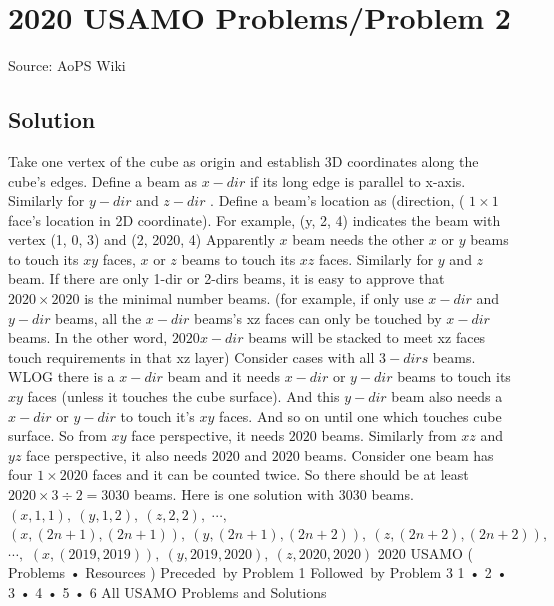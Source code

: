 \documentclass[12pt]{article}
\begin{document}
\section*{{2020 USAMO Problems/Problem 2}}
Source: AoPS Wiki

\subsection*{Solution}
Take one vertex of the cube as origin and establish 3D coordinates along the cube's edges. Define a beam as $x-dir$ if its long edge is parallel to x-axis. Similarly for $y-dir$ and $z-dir$ . Define a beam's location as (direction, ( $1 \times 1$ face's location in 2D coordinate). For example, (y, 2, 4) indicates the beam with vertex (1, 0, 3) and (2, 2020, 4) Apparently $x$ beam needs the other $x$ or $y$ beams to touch its $xy$ faces, $x$ or $z$ beams to touch its $xz$ faces. Similarly for $y$ and $z$ beam. If there are only 1-dir or 2-dirs beams, it is easy to approve that $2020 \times 2020$ is the minimal number beams. (for example, if only use $x-dir$ and $y-dir$ beams, all the $x-dir$ beams's xz faces can only be touched by $x-dir$ beams. In the other word, $2020 x-dir$ beams will be stacked to meet xz faces touch requirements in that xz layer) Consider cases with all $3-dirs$ beams.
WLOG there is a $x-dir$ beam and it needs $x-dir$ or $y-dir$ beams to touch its $xy$ faces (unless it touches the cube surface). And this $y-dir$ beam also needs a $x-dir$ or $y-dir$ to touch it's $xy$ faces. And so on until one which touches cube surface. So from $xy$ face perspective, it needs $2020$ beams. Similarly from $xz$ and $yz$ face perspective, it also needs $2020$ and $2020$ beams. Consider one beam has four $1 \times 2020$ faces and it can be counted twice. So there should be at least $2020 \times 3 \div 2=3030$ beams. Here is one solution with 3030 beams. $(x, 1, 1),\ (y, 1, 2),\ (z, 2, 2),$ $\cdots ,$ $(x, (2n+1), (2n+1)),\ (y, (2n+1), (2n+2)),\ (z, (2n+2), (2n+2)),$ $\cdots ,$ $(x, (2019, 2019)),\ (y, 2019, 2020),\ (z, 2020, 2020)$ 2020 USAMO ( Problems • Resources ) Preceded by Problem 1 Followed by Problem 3 1 • 2 • 3 • 4 • 5 • 6 All USAMO Problems and Solutions
\end{document}
